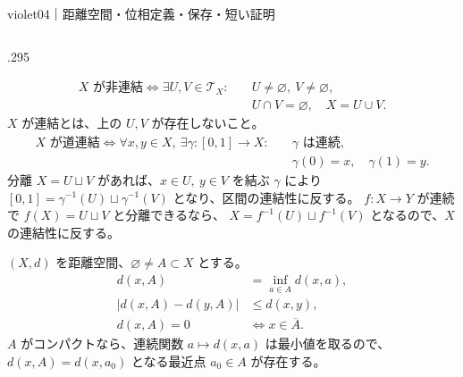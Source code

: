 \begin{sheetframe}[50]{violet}{04｜距離空間・位相}{定義・保存・短い証明}
\begin{columns}[T,onlytextwidth]
\begin{column}{.295\textwidth}
\begin{center}
\end{center}
\[
\begin{aligned}
X\text{ が非連結}
\iff
\exists U,V\in\mathcal T_X:\quad
&U\ne\varnothing,\ V\ne\varnothing,\\
&U\cap V=\varnothing,\quad X=U\cup V.
\end{aligned}
\]
$X$ が連結とは、上の $U,V$ が存在しないこと。
\[
\begin{aligned}
X\text{ が道連結}
\iff
\forall x,y\in X,\ \exists\gamma:[0,1]\to X:\quad
&\gamma\text{ は連続},\\
&\gamma(0)=x,\quad\gamma(1)=y.
\end{aligned}
\]
分離 $X=U\sqcup V$ があれば、$x\in U,\ y\in V$ を結ぶ $\gamma$ により
$[0,1]=\gamma^{-1}(U)\sqcup\gamma^{-1}(V)$ となり、区間の連結性に反する。
$f:X\to Y$ が連続で $f(X)=U\sqcup V$ と分離できるなら、
$X=f^{-1}(U)\sqcup f^{-1}(V)$ となるので、$X$ の連結性に反する。

\separator
{}
$(X,d)$ を距離空間、$\varnothing\ne A\subset X$ とする。
\[
\begin{aligned}
d(x,A)&=\inf_{a\in A}d(x,a),\\
|d(x,A)-d(y,A)|&\le d(x,y),\\
d(x,A)=0&\iff x\in\overline A.
\end{aligned}
\]
$A$ がコンパクトなら、連続関数 $a\mapsto d(x,a)$ は最小値を取るので、
$d(x,A)=d(x,a_0)$ となる最近点 $a_0\in A$ が存在する。


\end{column}
\end{columns}
\end{sheetframe}
